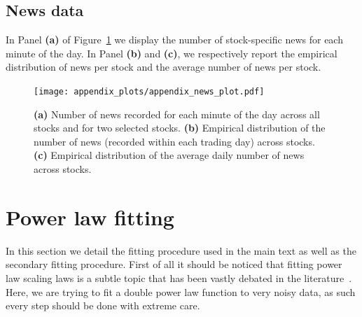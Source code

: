 \documentclass[amsmath,amssymb,aps,pre,floatfix,twocolumn,superscriptaddress]{revtex4}
\begin{document}
\subsection{News data}

In Panel \textbf{(a)} of Figure~\ref{fig: appendix 2} we display the number of stock-specific news for each minute of the day. In Panel \textbf{(b)} and \textbf{(c)}, we respectively report the empirical distribution of news per stock and the average number of news per stock.

\begin{figure}
  \centering
  \texttt{[image: appendix\_plots/appendix\_news\_plot.pdf]}
  \caption{\textbf{(a)} Number of news recorded for each minute of the day across all stocks and for two selected stocks. \textbf{(b)} Empirical distribution of the number of news (recorded within each trading day) across stocks. \textbf{(c)} Empirical distribution of the average daily number of news across stocks.}  
  \label{fig: appendix 2}
\end{figure}

\section{Power law fitting}

In this section we detail the fitting procedure used in the main text as well as the secondary fitting procedure. First of all it should be noticed that fitting power law scaling laws is a subtle topic that has been vastly debated in the literature~\cite{beran1994statistics}. Here, we are trying to fit a double power law function to very noisy data, as such every step should be done with extreme care. 
\end{document}
